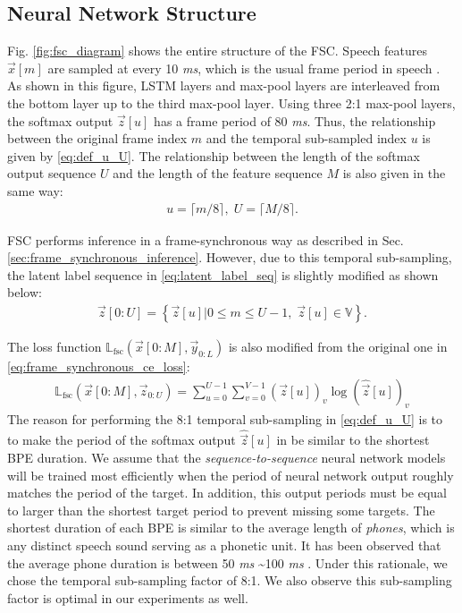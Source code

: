 \documentclass{article}
\begin{document}
\subsection{Neural Network Structure}
\label{sec:neural_network_structure}
Fig. \ref{fig:fsc_diagram} shows the entire structure of the FSC. 
Speech features $\vec{x}[m]$ are sampled 
at every 10 {\it ms}, which is the usual frame period in speech 
\cite{x_huang_prentice_hall_2001_00, c_kim_taslp_2016_00}.
As shown in this figure, LSTM layers and max-pool layers
are interleaved from the bottom layer up to the third max-pool layer.
Using three 2:1 max-pool layers, the softmax output $\vec{z}[u]$ has 
a frame period of 80 {\it ms}.  Thus, the relationship between the original frame 
index $m$ and the temporal sub-sampled index $u$ is given by \eqref{eq:def_u_U}.
The relationship between the length of the softmax output sequence $U$
and the length of the feature sequence $M$ is also given in the same way:
	\begin{align}
		u = \lceil m / 8 \rceil,  \; U = \lceil M / 8 \rceil \label{eq:def_u_U}.
	\end{align}

FSC performs inference in a frame-synchronous way as described in 
Sec. \ref{sec:frame_synchronous_inference}. 
However, due to this temporal sub-sampling, the latent label sequence 
in \eqref{eq:latent_label_seq} is slightly modified as shown below:
\begin{align}
  \vec{z}[0:U]  =  
    \left\{\vec{z}[u]  \Big| 0 \le m \le U-1, \; \vec{z}[u] \in \mathbb{V} \right\}.
  \label{eq:subsampled_latent_label_seq}
\end{align}


The loss function 
$\mathbb{L}_{\text{fsc}}\left(\vec{x}[0:M], \vec{y}_{0:L}\right)$ 
is also modified from the original one in 
\eqref{eq:frame_synchronous_ce_loss}:
\begin{align}
	\mathbb{L}_{\text{fsc}}
    \left(\vec{x}[0:M], \vec{z}_{0:U}\right)
      = \sum_{u=0}^{U-1}  
          \sum_{v=0}^{V-1}
          {(\vec{z}[u])_v}  \log ( 
             \widehat{\vec{z}}[u] )_v  
        \label{eq:fsc_ce_loss} 
\end{align}
The reason for performing the 8:1 temporal sub-sampling in \eqref{eq:def_u_U} is to 
to make the period of the softmax output $\widehat{\vec{z}}[u]$ in \label{eq:fsc_ce_loss} 
be similar to the shortest BPE duration. We assume that the {\it sequence-to-sequence}
neural network models will be trained most efficiently when the period of neural 
network output roughly matches the period of the target. In addition, this
output periods must be equal to larger than the shortest target period to prevent
missing some targets.
The shortest duration of each BPE is similar to the average length of {\it phones}, 
which is any distinct speech sound serving as a phonetic unit.
It has been observed that the average phone duration is between 50 {\it ms}
\textasciitilde 100 {\it ms} \cite{x_wang_icslp_1996_00, z_bartosz_ltc_2009_00}.
Under this rationale, we chose the temporal sub-sampling factor of 8:1. 
We also observe this sub-sampling factor is optimal in our experiments as well.
\end{document}
